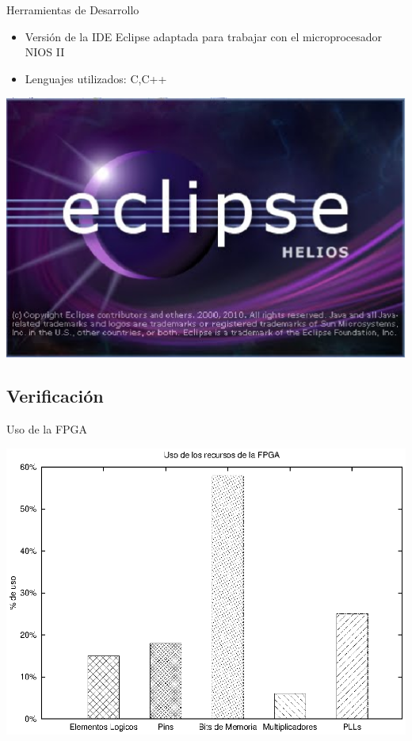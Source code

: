\documentclass[xcolor=dvipsnames]{beamer}
\begin{document}
\begin{frame}{Herramientas de Desarrollo}
\begin{block}
    \begin{itemize}
      \scriptsize
     	\item Versión de la IDE Eclipse adaptada para trabajar con el microprocesador NIOS II
	\item Lenguajes utilizados: C,C++
    \end{itemize}
	\center	
	\includegraphics[scale=0.10]{figures/eclipse.eps}  	
  \end{block}
\end{frame}

\subsection{Verificación}

\begin{frame}{Uso de la FPGA}

	\center	
	\includegraphics[scale=0.70]{figures/fpga.eps}  

\end{frame}
\end{document}
